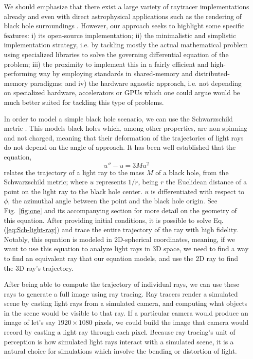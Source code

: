We should emphasize that there exist a large variety of raytracer implementations already 
\cite{imbens2023graphicalprocessinggeodesicpropagation,10.2312/EGPGV/EGPGV12/051-060,7539599_OSPRay}
and even with direct astrophysical applications such as the rendering of black hole surroundings
\cite{10.2312:vmv.20221208,sharma2023mahakalapythonbasedmodularraytracing,James_2015}.
However, our approach seeks to highlight some specific features:
i) its open-source implementation;
ii) the minimalistic and simplistic implementation strategy, i.e. by tackling
mostly the actual mathematical problem using specialized libraries
to solve the governing differential equation of the problem;
iii) the proximity  to implement this in a fairly efficient and high-performing
way by employing standards in shared-memory and distributed-memory paradigms;
and iv) the hardware agnostic approach, i.e. not depending on specialized hardware, accelerators or GPUs which one could argue would be much better suited for tackling this type of problems.

In order to model a simple black hole scenario, we can use the Schwarzschild metric \cite{schw_soln-2007}.
This models black holes which, among other properties, are non-spinning and not charged,
meaning that their deformation of the trajectories of light rays do not depend on the angle of approach.
It has been well established \cite{gravitation-mtw} that the equation,
\begin{equation}
	u'' - u = 3 M u^2
	\label{eq:Sch-light-ray}
\end{equation}
relates the trajectory of a light ray to the mass $M$ of a black hole, from the Schwarzschild metric;
where $u$ represents $1/r$, being $r$ the Euclidean distance of a point on the light ray to the black hole center.
$u$ is differentiated with respect to $\phi$, the azimuthal angle between the point and the black hole origin.
See Fig.~\ref{fig:one} and its accompanying section for more detail on the geometry of this equation.
After providing initial conditions,  it is possible to solve Eq.(\ref{eq:Sch-light-ray}) and trace the entire trajectory of the ray with high fidelity.
Notably, this equation is modeled in 2D-spherical coordinates, meaning, if we want to use this equation to analyze light rays in 3D space, we need to find a way to find an equivalent ray that our equation models, and use the 2D ray to find the 3D ray's trajectory.

After being able to compute the trajectory of individual rays, we can use these rays to generate a full image using ray tracing. Ray tracers render a simulated scene by casting light rays from a simulated camera, and computing what objects in the scene would be visible to that ray. If a particular camera would produce an image of let's say $1920 \times 1080$ pixels, we could build the image that camera would record by casting a light ray through each pixel. Because ray tracing's unit of perception is how simulated light rays interact with a simulated scene, it is a natural choice for simulations which involve the bending or distortion of light.

